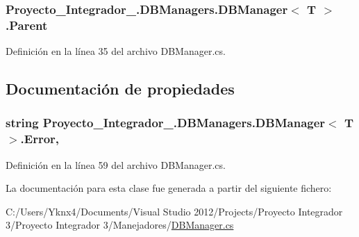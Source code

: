 \hypertarget{class_proyecto___integrador__3_1_1_d_b_managers_1_1_d_b_manager_3_01_t_01_4_a06315e75298c8f2fd46f32dc7c9a80b2}{
\subsubsection[{Parent}]{ Proyecto\-\_\-\-Integrador\-\_.\-D\-B\-Managers.\-D\-B\-Manager$<$ T $>$.Parent\hspace{0.3cm}{\ttfamily [protected]}}}\label{class_proyecto___integrador__3_1_1_d_b_managers_1_1_d_b_manager_3_01_t_01_4_a06315e75298c8f2fd46f32dc7c9a80b2}


Definición en la línea 35 del archivo D\-B\-Manager.\-cs.



\subsection{Documentación de propiedades}
\hypertarget{class_proyecto___integrador__3_1_1_d_b_managers_1_1_d_b_manager_3_01_t_01_4_a6e5caaed2ee1a4d067dfbf5aaa1b1fa8}{
\subsubsection[{Error}]{\setlength{\rightskip}{0pt plus 5cm}string Proyecto\-\_\-\-Integrador\-\_.\-D\-B\-Managers.\-D\-B\-Manager$<$ T $>$.Error\hspace{0.3cm}{\ttfamily [get]}, {\ttfamily [set]}}}\label{class_proyecto___integrador__3_1_1_d_b_managers_1_1_d_b_manager_3_01_t_01_4_a6e5caaed2ee1a4d067dfbf5aaa1b1fa8}


Definición en la línea 59 del archivo D\-B\-Manager.\-cs.



La documentación para esta clase fue generada a partir del siguiente fichero\-:\begin{DoxyCompactItemize}
\item 
C\-:/\-Users/\-Yknx4/\-Documents/\-Visual Studio 2012/\-Projects/\-Proyecto Integrador 3/\-Proyecto Integrador 3/\-Manejadores/\hyperlink{_d_b_manager_8cs}{D\-B\-Manager.\-cs}\end{DoxyCompactItemize}
